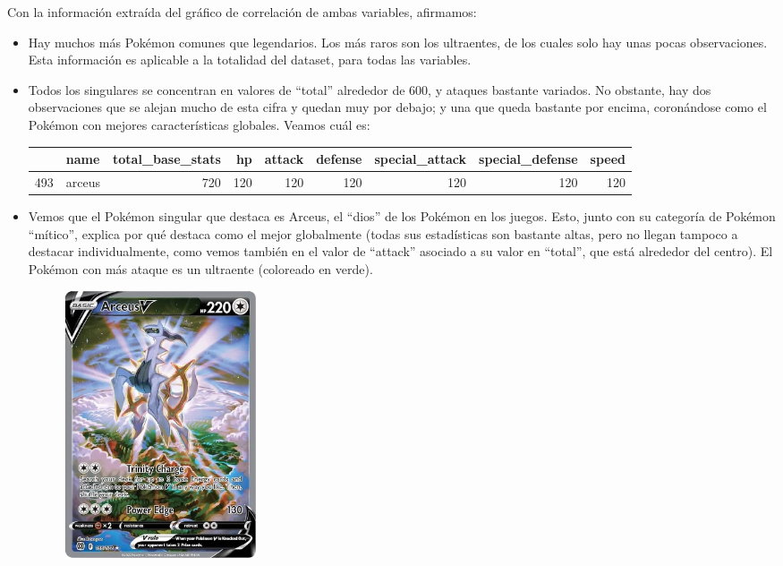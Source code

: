 \documentclass[
  11.8pt,
]{extreport}
\begin{document}
Con la información extraída del gráfico de correlación de ambas
variables, afirmamos:

\begin{itemize}
\item
  Hay muchos más Pokémon comunes que legendarios. Los más raros son los
  ultraentes, de los cuales solo hay unas pocas observaciones. Esta
  información es aplicable a la totalidad del dataset, para todas las
  variables.
\item
  Todos los singulares se concentran en valores de ``total'' alrededor
  de 600, y ataques bastante variados. No obstante, hay dos
  observaciones que se alejan mucho de esta cifra y quedan muy por
  debajo; y una que queda bastante por encima, coronándose como el
  Pokémon con mejores características globales. Veamos cuál es:

  \begin{table}[H]
  \centering\begingroup\fontsize{9.5}{11.5}\selectfont

  \begin{tabular}{llrrrrrrr}
  \toprule
    & name & total\_base\_stats & hp & attack & defense & special\_attack & special\_defense & speed\\
  \midrule
  493 & arceus & 720 & 120 & 120 & 120 & 120 & 120 & 120\\
  \bottomrule
  \end{tabular}
  \endgroup{}
  \end{table}
\item
  Vemos que el Pokémon singular que destaca es Arceus, el ``dios'' de
  los Pokémon en los juegos. Esto, junto con su categoría de Pokémon
  ``mítico'', explica por qué destaca como el mejor globalmente (todas
  sus estadísticas son bastante altas, pero no llegan tampoco a destacar
  individualmente, como vemos también en el valor de ``attack'' asociado
  a su valor en ``total'', que está alrededor del centro). El Pokémon
  con más ataque es un ultraente (coloreado en verde).

  \begin{figure}[H]

  {\centering \includegraphics[width=2.23958in,height=\textheight]{trabajo_images/arceus_carta.jpg}

}
\end{figure}
\end{itemize}
\end{document}
